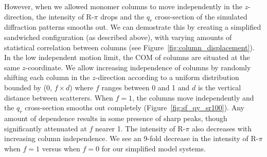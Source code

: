 \documentclass[journal=jpcbfk,manuscript=article]{achemso}
\begin{document}
  However, when we allowed monomer columns to move independently in the
  $z$-direction, the intensity of R-$\pi$ drops and the $q_r$ cross-section of
  the simulated diffraction patterns smooths out. We can demostrate this by
  creating a simplified sandwiched configuration (as described above), with
  varying amounts of statistical correlation between columns (see
  Figure~\ref{fig:column_displacement}). In the low independent motion limit, the
  COM of columns are situated at the same $z$-coordinate.  We allow increasing
  independence of columns by randomly shifting each column in the $z$-direction
  according to a uniform distribution bounded by (0, $f \times \mathit{d}$) where
  $f$ ranges between 0 and 1 and $d$ is the vertical distance between scatterers.
  When $f = 1$, the columns move independently and the $q_r$ cross-section
  smooths out completely (Figure~\ref{fig:sf_qy_sr100}). Any amount of dependence
  results in some presence of sharp peaks, though significantly attenuated at $f$
  nearer 1. The intensity of R-$\pi$ also decreases with increasing column
  independence. We see an 9-fold decrease in the intensity of R-$\pi$ when $f=1$
  versus when $f=0$ for our simplified model systems.
\end{document}
